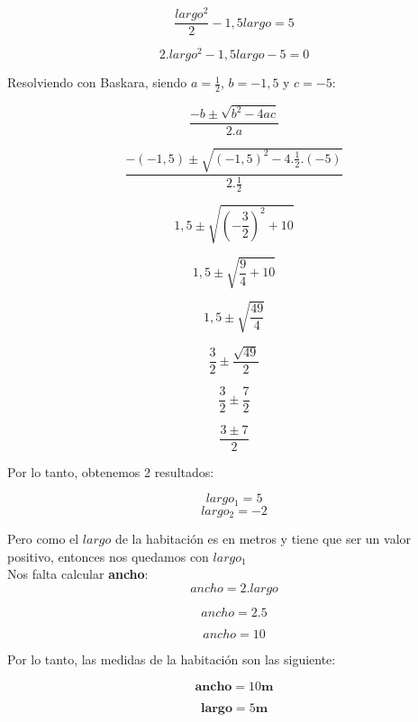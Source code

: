     $$ \frac{largo^2}{2} -1,5largo = 5 $$
    
    $$ 2.largo^2 -1,5largo -5 = 0 $$
    
    Resolviendo con Baskara, siendo $a=\frac{1}{2}$, $b=-1,5$ y $c=-5$:
    
    $$ \frac{-b\pm\sqrt{b^2-4ac}}{2.a} $$
    
    $$ \frac{-(-1,5)\pm\sqrt{(-1,5)^2-4.\frac{1}{2}.(-5)}}{2.\frac{1}{2}} $$
    
    $$ 1,5\pm\sqrt{(-\frac{3}{2})^2+10} $$
    
    $$ 1,5\pm\sqrt{\frac{9}{4}+10} $$

    $$ 1,5\pm\sqrt{\frac{49}{4}} $$
    
    $$ \frac{3}{2} \pm \frac{\sqrt{49}}{2} $$
    
    $$ \frac{3}{2} \pm \frac{7}{2} $$
    
    $$ \frac{3 \pm 7 }{2}  $$
    
        
    Por lo tanto, obtenemos 2 resultados:
    
    $$largo_1 = 5 $$
    $$largo_2 = -2 $$
    
    Pero como el $largo$ de la habitación es en metros y tiene que ser un valor positivo, entonces nos quedamos con $largo_1$ \\
    
    Nos falta calcular \textbf{ancho}: \\
    
    $$ ancho = 2 .largo $$
    
    $$ ancho = 2 . 5 $$
    
    $$ ancho = 10 $$
    
    
    Por lo tanto, las medidas de la habitación son las siguiente:
    
    $$ \textbf{ancho} = 10 \textbf{m} $$  
    
    $$ \textbf{largo} = 5 \textbf{m} $$
    